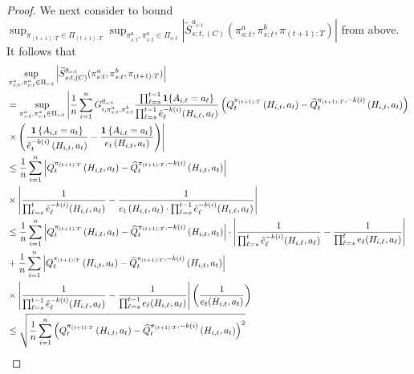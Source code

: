 \begin{proof}
We next consider to bound $\sup_{\pi_{(t+1):T} \in  \Pi_{(t+1):T}}\sup_{\pi_{s:t}^{a},\pi_{s:t}^{a}\in \Pi_{s:t}} \left| \widetilde{S}_{s:t,(C)}^{\underline{a}_{s:t}}(\pi_{s:t}^{a},\pi_{s:t}^{b},\pi_{(t+1):T})\right|$ from above. 
It follows that 
\begin{align*}
&\sup_{\pi_{s:t}^{a},\pi_{s:t}^{a}\in \Pi_{s:t}} \left| \widetilde{S}_{s:t,(C)}^{\underline{a}_{s:t}}(\pi_{s:t}^{a},\pi_{s:t}^{b},\pi_{(t+1):T})\right|\\
	&=\sup_{\pi_{s:t}^{a},\pi_{s:t}^{a}\in \Pi_{s:t}} \left| \frac{1}{n}\sum_{i=1}^{n}G_{i,\pi_{s:t}^{a},\pi_{s:t}^{b}}^{\underline{a}_{s:t}}\frac{\prod_{\ell=s}^{t-1}\mathbf{1}\{A_{i,\ell}=a_{\ell}\}}{\prod_{\ell=s}^{t-1}\hat{e}_{\ell}^{-k(i)}(H_{i,\ell},a_{\ell})} 
\left(Q_{t}^{\pi_{(t+1):T}}\left(H_{i,t},a_{t}\right)-\widehat{Q}_{t}^{\pi_{(t+1):T},-k(i)}\left(H_{i,t},a_{t}\right)\right) \right. \notag \\ 
&\left. \times \left(\frac{\mathbf{1}\left\{ A_{i,t}=a_{t}\right\} }{\hat{e}_{t}^{-k(i)}\left(H_{i,t},a_{t}\right)}-\frac{\mathbf{1}\left\{ A_{i,t}=a_{t}\right\} }{e_{t}\left(H_{i,t},a_{t}\right)}\right) \right| \\
	&\leq\frac{1}{n}\sum_{i=1}^{n}\left|Q_{t}^{\pi_{(t+1):T}}\left(H_{i,t},a_{t}\right)-\widehat{Q}_{t}^{\pi_{(t+1):T},-k(i)}\left(H_{i,t},a_{t}\right)\right| \\
 &\times \left|\frac{1}{\prod_{\ell=s}^{t}\hat{e}_{\ell}^{-k(i)}(H_{i,\ell},a_{\ell})}-\frac{1}{e_{t}\left(H_{i,t},a_{t}\right)\cdot\prod_{\ell=s}^{t-1}\hat{e}_{\ell}^{-k(i)}(H_{i,\ell},a_{\ell})}\right|\\
	&\leq\frac{1}{n}\sum_{i=1}^{n}\left|Q_{t}^{\pi_{(t+1):T}}\left(H_{i,t},a_{t}\right)-\widehat{Q}_{t}^{\pi_{(t+1):T},-k(i)}\left(H_{i,t},a_{t}\right)\right| \cdot \left|\frac{1}{\prod_{\ell=s}^{t}\hat{e}_{\ell}^{-k(i)}(H_{i,\ell},a_{\ell})}-\frac{1}{\prod_{\ell=s}^{t}e_{\ell}(H_{i,\ell},a_{\ell})}\right|\\
	&+\frac{1}{n}\sum_{i=1}^{n}\left|Q_{t}^{\pi_{(t+1):T}}\left(H_{i,t},a_{t}\right)-\widehat{Q}_{t}^{\pi_{(t+1):T},-k(i)}\left(H_{i,t},a_{t}\right)\right| \\
 &\times \left|\frac{1}{\prod_{\ell=s}^{t-1}\hat{e}_{\ell}^{-k(i)}(H_{i,\ell},a_{\ell})}-\frac{1}{\prod_{\ell=s}^{t-1}e_{\ell}(H_{i,\ell},a_{\ell})}\right|\left(\frac{1}{e_t(H_{i,t},a_t)}\right)\\
	&\leq\sqrt{\frac{1}{n}\sum_{i=1}^{n}\left(Q_{t}^{\pi_{(t+1):T}}\left(H_{i,t},a_{t}\right)-\widehat{Q}_{t}^{\pi_{(t+1):T},-k(i)}\left(H_{i,t},a_{t}\right)\right)^{2}} \\

\end{align*}
\end{proof}
